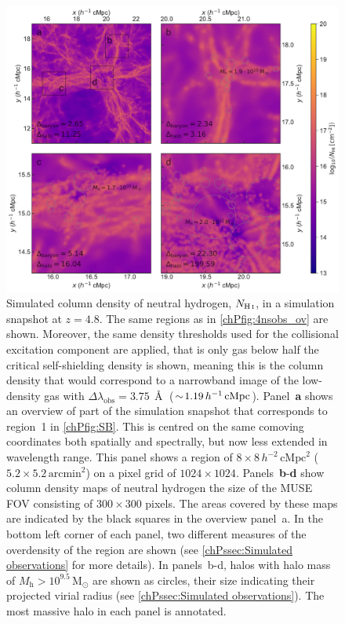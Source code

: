 \begin{figure}
    \centering
    \includegraphics[width=\linewidth]{"Plots/ChapterP/Column_density"}
    \caption[Observed column density at $z=4.8$]
    {Simulated column density of neutral hydrogen, $N_\text{\ion{H}{I}}$, in a simulation snapshot at $z=4.8$. The same regions as in \cref{chPfig:4nsobs_ov} are shown. Moreover, the same density thresholds used for the collisional excitation component are applied, that is only gas below half the critical self-shielding density is shown, meaning this is the column density that would correspond to a narrowband image of the low-density gas with $\Delta \lambda_\text{obs} = 3.75 \, \Angstrom$ ($\sim \! 1.19 \, h^{-1} \, \mathrm{cMpc}$). Panel~\textbf{a} shows an overview of part of the simulation snapshot that corresponds to region~1 in \cref{chPfig:SB}. This is centred on the same comoving coordinates both spatially and spectrally, but now less extended in wavelength range. This panel shows a region of $8 \times 8 \, h^{-2} \, \mathrm{cMpc}^2$ ($5.2 \times 5.2 \, \mathrm{arcmin}^2$) on a pixel grid of $1024 \times 1024$. Panels~\textbf{b}-\textbf{d} show column density maps of neutral hydrogen the size of the MUSE FOV consisting of $300 \times 300$ pixels. The areas covered by these maps are indicated by the black squares in the overview panel~a. In the bottom left corner of each panel, two different measures of the overdensity of the region are shown (see \cref{chPssec:Simulated observations} for more details). In panels~b-d, halos with halo mass of $M_\mathrm{h} > 10^{9.5} \, \mathrm{M_\odot}$ are shown as circles, their size indicating their projected virial radius (see \cref{chPssec:Simulated observations}). The most massive halo in each panel is annotated.}
    \label{appPfig:NHI}
\end{figure}
